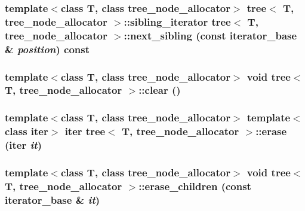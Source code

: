 \hypertarget{classtree_29f1278d76269eb71f2e9ff2bb722780}{
\subsubsection{\setlength{\rightskip}{0pt plus 5cm}template$<$class T, class tree\_\-node\_\-allocator$>$ {\bf tree}$<$ T, tree\_\-node\_\-allocator $>$::{\bf sibling\_\-iterator} {\bf tree}$<$ T, tree\_\-node\_\-allocator $>$::next\_\-sibling (const {\bf iterator\_\-base} \& {\em position}) const}}
\label{classtree_29f1278d76269eb71f2e9ff2bb722780}


\hypertarget{classtree_a8cf6dfe17504abfc0ffabb5a4ba9d0a}{
\subsubsection{\setlength{\rightskip}{0pt plus 5cm}template$<$class T, class tree\_\-node\_\-allocator$>$ void {\bf tree}$<$ T, tree\_\-node\_\-allocator $>$::clear ()}}
\label{classtree_a8cf6dfe17504abfc0ffabb5a4ba9d0a}


\hypertarget{classtree_3eb424c89446ae17a747d2aca2cdda4b}{
\subsubsection{\setlength{\rightskip}{0pt plus 5cm}template$<$class T, class tree\_\-node\_\-allocator$>$ template$<$class iter$>$ iter {\bf tree}$<$ T, tree\_\-node\_\-allocator $>$::erase (iter {\em it})}}
\label{classtree_3eb424c89446ae17a747d2aca2cdda4b}


\hypertarget{classtree_05d5fd71c206efc8ac30df5cd46176bc}{
\subsubsection{\setlength{\rightskip}{0pt plus 5cm}template$<$class T, class tree\_\-node\_\-allocator$>$ void {\bf tree}$<$ T, tree\_\-node\_\-allocator $>$::erase\_\-children (const {\bf iterator\_\-base} \& {\em it})}}
\label{classtree_05d5fd71c206efc8ac30df5cd46176bc}


